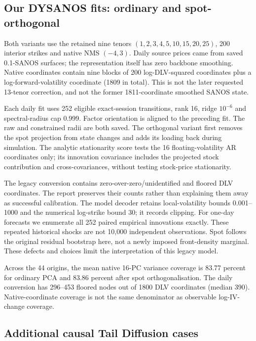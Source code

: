 \documentclass[11pt]{article}
\begin{document}
\subsection{Our DYSANOS fits: ordinary and spot-orthogonal}

Both variants use the retained nine tenors $(1,2,3,4,5,10,15,20,25)$, 200 interior strikes and native NMS $(-4,3)$. Daily source prices came from saved 0.1-SANOS surfaces; the representation itself has zero backbone smoothing. Native coordinates contain nine blocks of 200 log-DLV-squared coordinates plus a log-forward-volatility coordinate (1809 in total). This is not the later requested 13-tenor correction, and not the former 1811-coordinate smoothed SANOS state.

Each daily fit uses 252 eligible exact-session transitions, rank 16, ridge $10^{-6}$ and spectral-radius cap 0.999. Factor orientation is aligned to the preceding fit. The raw and constrained radii are both saved. The orthogonal variant first removes the spot projection from state changes and adds its loading back during simulation. The analytic stationarity score tests the 16 floating-volatility AR coordinates only; its innovation covariance includes the projected stock contribution and cross-covariances, without testing stock-price stationarity.

The legacy conversion contains zero-over-zero/unidentified and floored DLV coordinates. The report preserves their counts rather than explaining them away as successful calibration. The model decoder retains local-volatility bounds 0.001--1000 and the numerical log-strike bound 30; it records clipping. For one-day forecasts we enumerate all 252 paired empirical innovations exactly. These repeated historical shocks are not 10,000 independent observations. Spot follows the original residual bootstrap here, not a newly imposed front-density marginal. These defects and choices limit the interpretation of this legacy model.

Across the 44 origins, the mean native 16-PC variance coverage is 83.77 percent for ordinary PCA and 83.86 percent after spot orthogonalisation. The daily conversion has 296--453 floored nodes out of 1800 DLV coordinates (median 390). Native-coordinate coverage is not the same denominator as observable log-IV-change coverage.

\subsection{Additional causal Tail Diffusion cases}
\end{document}
